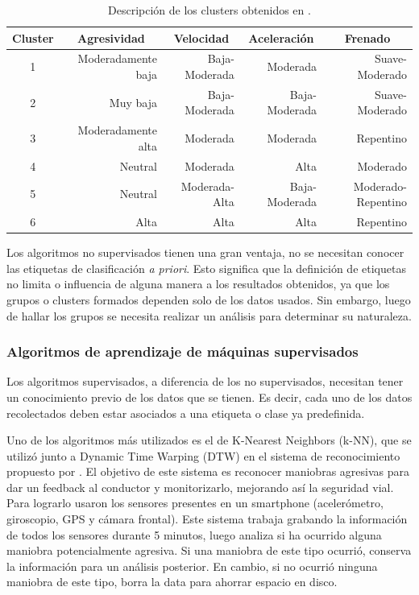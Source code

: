 \begin{table}[htbp!]
\centering
\caption[Descripción de los clusters obtenidos]{Descripción de los clusters obtenidos en \cite{constantinescu}.}
\begin{tabular}{crrrr}
\toprule
\multicolumn{1}{l}{\textbf{Cluster}} & \multicolumn{1}{c}{\textbf{Agresividad}} & \multicolumn{1}{c}{\textbf{Velocidad}} & \multicolumn{1}{c}{\textbf{Aceleración}} & \multicolumn{1}{c}{\textbf{Frenado}} \\ \midrule
1 & Moderadamente baja & Baja-Moderada & Moderada & Suave-Moderado \\
2 & Muy baja & Baja-Moderada & Baja-Moderada & Suave-Moderado \\
3 & Moderadamente alta & Moderada & Moderada & Repentino \\
4 & Neutral & Moderada & Alta & Moderado \\
5 & Neutral & Moderada-Alta & Baja-Moderada & Moderado-Repentino \\
6 & Alta & Alta & Alta & Repentino \\ \bottomrule
\end{tabular}
\label{diag:2.1}
\end{table}

Los algoritmos no supervisados tienen una gran ventaja, no se necesitan conocer las etiquetas de clasificación {\it a priori}. Esto significa que la definición de etiquetas no limita o influencia de alguna manera a los resultados obtenidos, ya que los grupos o clusters formados dependen solo de los datos usados. Sin embargo, luego de hallar los grupos se necesita realizar un análisis para determinar su naturaleza.

\subsubsection{Algoritmos de aprendizaje de máquinas supervisados}

Los algoritmos supervisados, a diferencia de los no supervisados, necesitan tener un conoci\-mien\-to previo de los datos que se tienen. Es decir, cada uno de los datos recolectados deben estar asociados a una etiqueta o clase ya predefinida.

Uno de los algoritmos más utilizados es el de K-Nearest Neighbors (k-NN), que se utilizó junto a Dynamic Time Warping (DTW) en el sistema de reconocimiento propuesto por \citeauthor{6083078} \cite{6083078}. El objetivo de este sistema es reconocer maniobras agresivas para dar un feedback al conductor y monitorizarlo, mejorando así la seguridad vial. Para lograrlo usaron los sensores presentes en un smartphone (acelerómetro, giroscopio, GPS y cámara frontal). Este sistema trabaja grabando la información de todos los sensores durante 5 minutos, luego analiza si ha ocurrido alguna maniobra potencialmente agresiva. Si una maniobra de este tipo ocurrió, conserva la información para un análisis posterior. En cambio, si no ocurrió ninguna maniobra de este tipo, borra la data para ahorrar espacio en disco.

